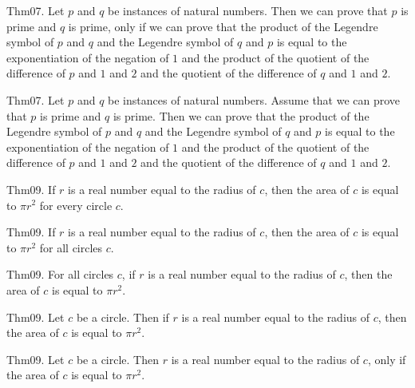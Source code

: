 \documentclass{article}
\begin{document}
Thm07. Let $p$ and $q$ be instances of natural numbers. Then we can prove that $p$ is prime and $q$ is prime, only if we can prove that the product of the Legendre symbol of $p$ and $q$ and the Legendre symbol of $q$ and $p$ is equal to the exponentiation of the negation of $1$ and the product of the quotient of the difference of $p$ and $1$ and $2$ and the quotient of the difference of $q$ and $1$ and $2$.

Thm07. Let $p$ and $q$ be instances of natural numbers. Assume that we can prove that $p$ is prime and $q$ is prime. Then we can prove that the product of the Legendre symbol of $p$ and $q$ and the Legendre symbol of $q$ and $p$ is equal to the exponentiation of the negation of $1$ and the product of the quotient of the difference of $p$ and $1$ and $2$ and the quotient of the difference of $q$ and $1$ and $2$.

Thm09. If $r$ is a real number equal to the radius of $c$, then the area of $c$ is equal to $\pi r ^ {2}$ for every circle $c$.

Thm09. If $r$ is a real number equal to the radius of $c$, then the area of $c$ is equal to $\pi r ^ {2}$ for all circles $c$.

Thm09. For all circles $c$, if $r$ is a real number equal to the radius of $c$, then the area of $c$ is equal to $\pi r ^ {2}$.

Thm09. Let $c$ be a circle. Then if $r$ is a real number equal to the radius of $c$, then the area of $c$ is equal to $\pi r ^ {2}$.

Thm09. Let $c$ be a circle. Then $r$ is a real number equal to the radius of $c$, only if the area of $c$ is equal to $\pi r ^ {2}$.
\end{document}
